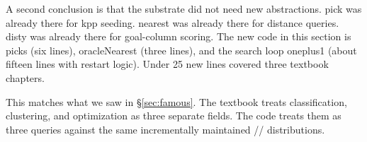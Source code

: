A second conclusion is that the substrate did not need new
abstractions. \textsf{pick} was already there for kpp seeding.
\textsf{nearest} was already there for distance queries.
\textsf{disty} was already there for goal-column scoring. The
new code in this section is \textsf{picks} (six lines),
\textsf{oracleNearest} (three lines), and the search loop
\textsf{oneplus1} (about fifteen lines with restart logic).
Under 25 new lines covered three textbook chapters.

This matches what we saw in \S\ref{sec:famous}. The textbook
treats classification, clustering, and optimization as three
separate fields. The code treats them as three queries against
the same incrementally maintained
// distributions.
